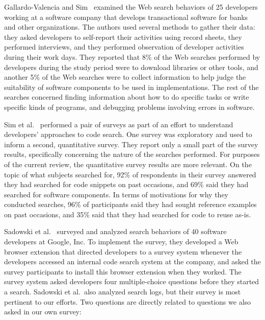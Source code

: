 \documentclass{casicswhitepaper}
\begin{document}
Gallardo-Valencia and Sim~\cite{gallardo2011kinds} examined the Web search behaviors of 25 developers working at a software company that develops transactional software for banks and other organizations.  The authors used several methods to gather their data: they asked developers to self-report their activities using record sheets, they performed interviews, and they performed observation of developer activities during their work days.  They reported that 8\% of the Web searches performed by developers during the study period were to download libraries or other tools, and another 5\% of the Web searches were to collect information to help judge the suitability of software components to be used in implementations.  The rest of the searches concerned finding information about how to do specific tasks or write specific kinds of programs, and debugging problems involving errors in software.

Sim et al.~\cite{sim2012software} performed a pair of surveys as part of an effort to understand developers' approaches to code search.  One survey was exploratory and used to inform a second, quantitative survey.  They report only a small part of the survey results, specifically concerning the nature of the searches performed.  For purposes of the current review, the quantitative survey results are more relevant.  On the topic of what subjects searched for, 92\% of respondents in their survey answered they had searched for code snippets on past occasions, and 69\% said they had searched for software components.  In terms of motivations for why they conducted searches, 96\% of participants said they had sought reference examples on past occasions, and 35\% said that they had searched for code to reuse as-is.

Sadowski et al.~\cite{sadowski2015developers} surveyed and analyzed search behaviors of 40 software developers at Google, Inc.  To  implement the survey, they developed a Web browser extension that directed developers to a survey system whenever the developers accessed an internal code search system at the company, and asked the survey participants to install this browser extension when they worked.  The survey system asked developers four multiple-choice questions before they started a search.  Sadowski et al.\ also analyzed search logs, but their survey is most pertinent to our efforts.  Two questions are directly related to questions we also asked in our own survey:
\end{document}
